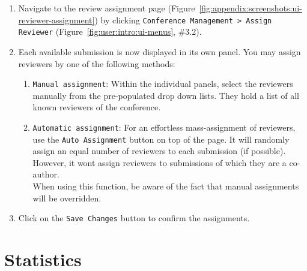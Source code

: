 \documentclass[nochapterpage,nopartpage,noheadingspace,numbersubsubsec,bigchapter,colorback,accentcolor=tud9c,10pt]{tudreport}
\begin{document}
        \begin{enumerate}
            \setlength\itemsep{0em}
            \item Navigate to the review assignment page (Figure~\ref{fig:appendix:screenshots:ui-reviewer-assignment}) by clicking \texttt{Conference Management > Assign Reviewer} (Figure~\ref{fig:user:intro:ui-menus}, \#3.2).
            \item Each available submission is now displayed in its own panel. You may assign reviewers by one of the following methods:
            \begin{enumerate}
                \item \texttt{Manual assignment}: Within the individual panels, select the reviewers manually from the pre-populated drop down lists. They hold a list of all known reviewers of the conference.
                \item \texttt{Automatic assignment}: For an effortless mass-assignment of reviewers, use the \texttt{Auto Assignment} button on top of the page. It will randomly assign an equal number of reviewers to each submission (if possible). However, it wont assign reviewers to submissions of which they are a co-author.\\
                When using this function, be aware of the fact that manual assignments will be overridden.
            \end{enumerate}
            \item Click on the \texttt{Save Changes} button to confirm the assignments.
        \end{enumerate}

  \section{Statistics}
  \label{ch:user:chair:statistics}
\end{document}
